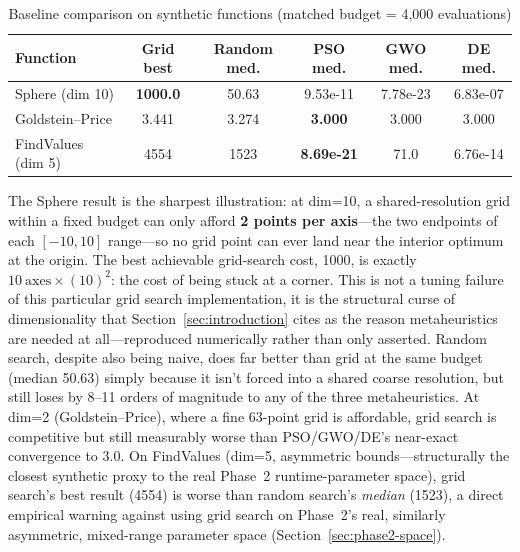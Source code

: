 \documentclass[journal]{IEEEtran}
\begin{document}
\begin{table}[t]
\caption{Baseline comparison on synthetic functions (matched budget = 4{,}000 evaluations)}
\label{tab:baseline-comparison}
\centering
\footnotesize
\begin{tabular}{@{}lccccc@{}}
\toprule
Function & Grid best & Random med. & PSO med. & GWO med. & DE med. \\
\midrule
Sphere (dim 10) & \textbf{1000.0} & 50.63 & 9.53e-11 & 7.78e-23 & 6.83e-07 \\
Goldstein--Price & 3.441 & 3.274 & \textbf{3.000} & 3.000 & 3.000 \\
FindValues (dim 5) & 4554 & 1523 & \textbf{8.69e-21} & 71.0 & 6.76e-14 \\
\bottomrule
\end{tabular}
\end{table}

The Sphere result is the sharpest illustration: at dim=10, a shared-resolution grid within a fixed budget can only afford \textbf{2 points per axis}---the two endpoints of each $[-10,10]$ range---so no grid point can ever land near the interior optimum at the origin. The best achievable grid-search cost, 1000, is exactly $10~\text{axes}\times(10)^2$: the cost of being stuck at a corner. This is not a tuning failure of this particular grid search implementation, it is the structural curse of dimensionality that Section~\ref{sec:introduction} cites as the reason metaheuristics are needed at all---reproduced numerically rather than only asserted. Random search, despite also being naive, does far better than grid at the same budget (median 50.63) simply because it isn't forced into a shared coarse resolution, but still loses by 8--11 orders of magnitude to any of the three metaheuristics. At dim=2 (Goldstein--Price), where a fine 63-point grid is affordable, grid search is competitive but still measurably worse than PSO/GWO/DE's near-exact convergence to 3.0. On FindValues (dim=5, asymmetric bounds---structurally the closest synthetic proxy to the real Phase~2 runtime-parameter space), grid search's best result (4554) is worse than random search's \emph{median} (1523), a direct empirical warning against using grid search on Phase~2's real, similarly asymmetric, mixed-range parameter space (Section~\ref{sec:phase2-space}).
\end{document}
